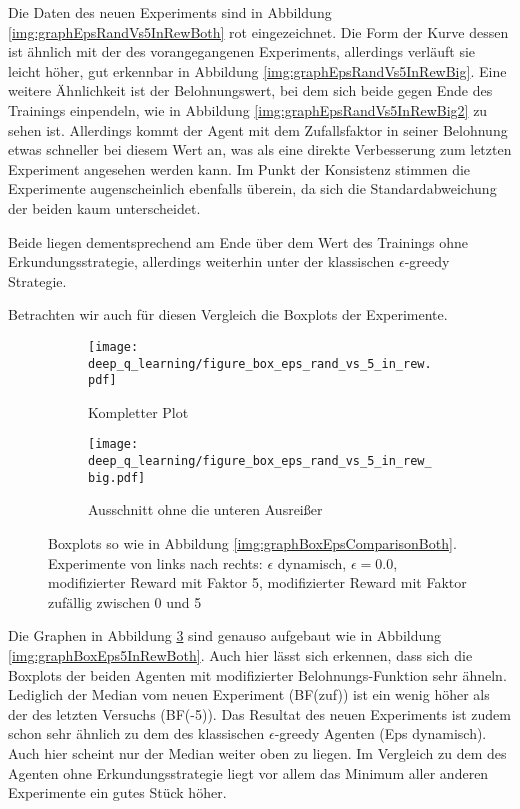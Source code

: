 Die Daten des neuen Experiments sind in Abbildung \ref{img:graphEpsRandVs5InRewBoth} rot eingezeichnet. Die Form der Kurve dessen ist ähnlich mit der des vorangegangenen Experiments, allerdings verläuft sie leicht höher, gut erkennbar in Abbildung \ref{img:graphEpsRandVs5InRewBig}. Eine weitere Ähnlichkeit ist der Belohnungswert, bei dem sich beide gegen Ende des Trainings einpendeln, wie in Abbildung \ref{img:graphEpsRandVs5InRewBig2} zu sehen ist. Allerdings kommt der Agent mit dem Zufallsfaktor in seiner Belohnung etwas schneller bei diesem Wert an, was als eine direkte Verbesserung zum letzten Experiment angesehen werden kann. Im Punkt der Konsistenz stimmen die Experimente augenscheinlich ebenfalls überein, da sich die Standardabweichung der beiden kaum unterscheidet.

Beide liegen dementsprechend am Ende über dem Wert des Trainings ohne Erkundungsstrategie, allerdings weiterhin unter der klassischen $ \epsilon $-greedy Strategie.

Betrachten wir auch für diesen Vergleich die Boxplots der Experimente.
\begin{figure}[h!]
    \centering
    \begin{subfigure}[b]{0.7\textwidth}
        \texttt{[image: deep\_q\_learning/figure\_box\_eps\_rand\_vs\_5\_in\_rew.pdf]}
        \caption{Kompletter Plot}
        \label{img:graphBoxEpsRandVs5InRew}
    \end{subfigure}
    \begin{subfigure}[b]{0.7\textwidth}
        \texttt{[image: deep\_q\_learning/figure\_box\_eps\_rand\_vs\_5\_in\_rew\_big.pdf]}
        \caption{Ausschnitt ohne die unteren Ausreißer}
        \label{img:graphBoxEpsRandVs5InRewBig}
    \end{subfigure}
    \caption{Boxplots so wie in Abbildung \ref{img:graphBoxEpsComparisonBoth}. Experimente von links nach rechts: $ \epsilon $ dynamisch, $ \epsilon = 0.0 $, modifizierter Reward mit Faktor 5, modifizierter Reward mit Faktor zufällig zwischen 0 und 5}
    \label{img:graphBoxEpsRandVs5InRewBoth}
\end{figure}
Die Graphen in Abbildung \ref{img:graphBoxEpsRandVs5InRewBoth} sind genauso aufgebaut wie in Abbildung \ref{img:graphBoxEps5InRewBoth}. Auch hier lässt sich erkennen, dass sich die Boxplots der beiden Agenten mit modifizierter Belohnungs-Funktion sehr ähneln. Lediglich der Median vom neuen Experiment (BF(zuf)) ist ein wenig höher als der des letzten Versuchs (BF(-5)). Das Resultat des neuen Experiments ist zudem schon sehr ähnlich zu dem des klassischen $ \epsilon $-greedy Agenten (Eps dynamisch). Auch hier scheint nur der Median weiter oben zu liegen. Im Vergleich zu dem des Agenten ohne Erkundungsstrategie liegt vor allem das Minimum aller anderen Experimente ein gutes Stück höher.


